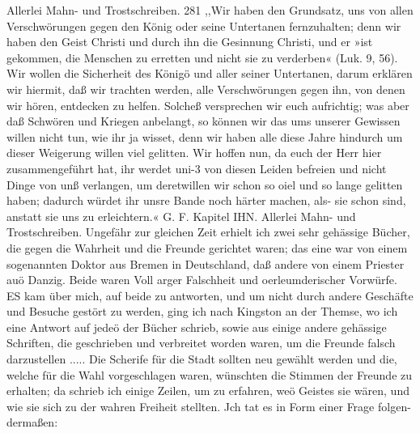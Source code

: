 Allerlei Mahn- und Trostschreiben. 281
,,Wir haben den Grundsatz, uns von allen Verschwörungen
gegen den König oder seine Untertanen fernzuhalten; denn wir
haben den Geist Christi und durch ihn die Gesinnung Christi,
und er »ist gekommen, die Menschen zu erretten und nicht sie zu
verderben« (Luk. 9, 56). Wir wollen die Sicherheit des Königö
und aller seiner Untertanen, darum erklären wir hiermit, daß
wir trachten werden, alle Verschwörungen gegen ihn, von denen
wir hören, entdecken zu helfen. Solcheß versprechen wir euch
aufrichtig; was aber daß Schwören und Kriegen anbelangt, so
können wir das ums unserer Gewissen willen nicht tun, wie ihr
ja wisset, denn wir haben alle diese Jahre hindurch um dieser
Weigerung willen viel gelitten. Wir hoffen nun, da euch der
Herr hier zusammengeführt hat, ihr werdet uni-3 von diesen Leiden
befreien und nicht Dinge von unß verlangen, um deretwillen wir
schon so oiel und so lange gelitten haben; dadurch würdet ihr
unsre Bande noch härter machen, als- sie schon sind, anstatt sie
uns zu erleichtern.« G. F.
Kapitel IHN.
Allerlei Mahn- und Trostschreiben.
Ungefähr zur gleichen Zeit erhielt ich zwei sehr gehässige
Bücher, die gegen die Wahrheit und die Freunde gerichtet waren;
das eine war von einem sogenannten Doktor aus Bremen in
Deutschland, daß andere von einem Priester auö Danzig. Beide
waren Voll arger Falschheit und oerleumderischer Vorwürfe. ES
kam über mich, auf beide zu antworten, und um nicht durch
andere Geschäfte und Besuche gestört zu werden, ging ich nach
Kingston an der Themse, wo ich eine Antwort auf jedeö der
Bücher schrieb, sowie aus einige andere gehässige Schriften, die
geschrieben und verbreitet worden waren, um die Freunde falsch
darzustellen .....
Die Scherife für die Stadt sollten neu gewählt werden und
die, welche für die Wahl vorgeschlagen waren, wünschten die
Stimmen der Freunde zu erhalten; da schrieb ich einige Zeilen,
um zu erfahren, weö Geistes sie wären, und wie sie sich zu der
wahren Freiheit stellten. Jch tat es in Form einer Frage folgen-
dermaßen:


